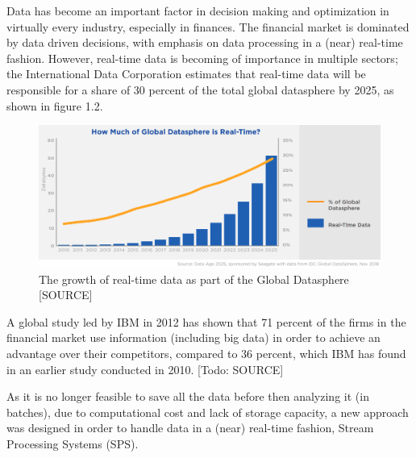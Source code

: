 Data has become an important factor in decision making and optimization in virtually every industry, especially in finances. 
The financial market is dominated by data driven decisions, with emphasis on data processing in a (near) real-time fashion.
However, real-time data is becoming of importance in multiple sectors; the International Data Corporation estimates that real-time data will be responsible for a share of 30 percent of the total global datasphere by 2025, as shown in figure 1.2.
\begin{figure}
\centering
\includegraphics[width=1.0\textwidth]{Bilder/realtime_data.png}
\caption{The growth of real-time data as part of the Global Datasphere [SOURCE]}
\label{fig:growth_realtime_data}
\end{figure}

A global study led by IBM in 2012 has shown that 71 percent of the firms in the financial market use information (including big data)
in order to achieve an advantage over their competitors, compared to 36 percent, which IBM has found in an earlier study conducted in 2010. [Todo: SOURCE]

As it is no longer feasible to save all the data before then analyzing it (in batches), due to computational cost and lack of storage capacity, a new approach was designed in order to handle data in a (near) real-time fashion, Stream Processing Systems (SPS).
